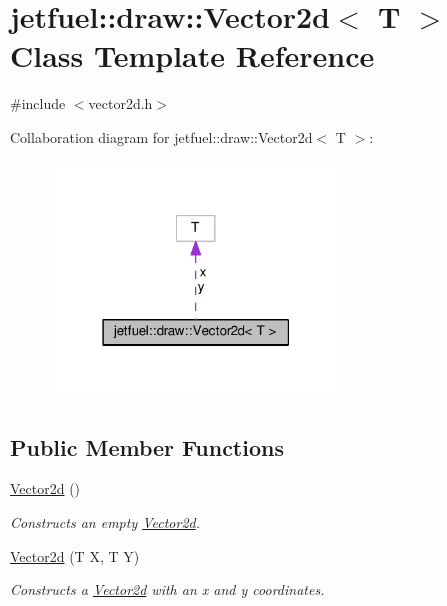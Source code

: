 \hypertarget{classjetfuel_1_1draw_1_1Vector2d}{}\section{jetfuel\+:\+:draw\+:\+:Vector2d$<$ T $>$ Class Template Reference}
\label{classjetfuel_1_1draw_1_1Vector2d}


{\ttfamily \#include $<$vector2d.\+h$>$}



Collaboration diagram for jetfuel\+:\+:draw\+:\+:Vector2d$<$ T $>$\+:\nopagebreak
\begin{figure}[H]
\begin{center}
\leavevmode
\includegraphics[width=219pt]{classjetfuel_1_1draw_1_1Vector2d__coll__graph}
\end{center}
\end{figure}
\subsection*{Public Member Functions}
\begin{DoxyCompactItemize}
\item 
\hyperlink{classjetfuel_1_1draw_1_1Vector2d_a99950184603c690d3f73753ff3a6500a}{Vector2d} ()
\begin{DoxyCompactList}\small\item\em Constructs an empty \hyperlink{classjetfuel_1_1draw_1_1Vector2d}{Vector2d}. \end{DoxyCompactList}\item 
\hyperlink{classjetfuel_1_1draw_1_1Vector2d_a4d083d396d055fab0385f2230177c386}{Vector2d} (T X, T Y)
\begin{DoxyCompactList}\small\item\em Constructs a \hyperlink{classjetfuel_1_1draw_1_1Vector2d}{Vector2d} with an x and y coordinates. \end{DoxyCompactList}\end{DoxyCompactItemize}

